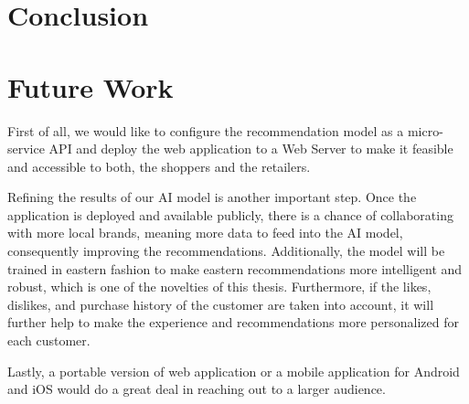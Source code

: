 \section{Conclusion}

\section{Future Work}

First of all, we would like to configure the recommendation model as a micro-service API and deploy the web application to a Web Server to make it feasible and accessible to both, the shoppers and the retailers.

Refining the results of our AI model is another important step. Once the application is deployed and available publicly, there is a chance of collaborating with more local brands, meaning more data to feed into the AI model, consequently improving the recommendations. Additionally, the model will be trained in eastern fashion to make eastern recommendations more intelligent and robust, which is one of the novelties of this thesis. Furthermore, if the likes, dislikes, and purchase history of the customer are taken into account, it will further help to make the experience and recommendations more personalized for each customer. 

Lastly, a portable version of web application or a mobile application for Android and iOS would do a great deal in reaching out to a larger audience.